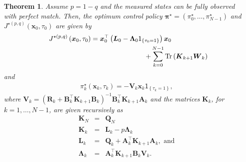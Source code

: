 \documentclass[10pt, journal, letterpaper]{IEEEtran}
\newcommand{\paren}[1]{\left(#1\right)}
\newcommand{\1}{\ensuremath{\mathbf{1}}} %
\newcommand{\I}[1]{\ensuremath{\mathsf{1}_{\left\{#1\right\}}}} %
\newcommand{\mincost}[2]{\ensuremath{J^{\star\paren{#1, #2}}}\paren{\vec{x}_0, \tau_0}}
\renewcommand{\vec}[1]{\ensuremath{\boldsymbol{#1}}} %
\newcommand{\tr}[1]{\ensuremath{{\rm Tr}\left(#1\right)}}
\newtheorem{theorem}{Theorem}
\begin{document}
\begin{theorem} \label{Thm: Min Cost Perfect State}
Assume $p = 1-q$ and the measured states can be {\em fully} observed with {\em perfect} match.  Then, the optimum control policy $\vec{\pi}^\star = \paren{\pi_0^\star, \ldots, \pi_{N-1}^\star}$ and $\mincost{p}{q}$ are given by
\begin{eqnarray}
\lefteqn{\mincost{p}{q} = \vec{x}_0^\top \paren{\vec{L}_0 - \vec{\Lambda}_0 \I{\tau_0 = 1}} \vec{x}_0} \hspace{8.0cm} \nonumber \\
\lefteqn{+\sum_{k=0}^{N-1} \tr{\vec{K}_{k+1} \vec{W}_k}} \label{Eqn: OptCost1}\hspace{3.0cm}
\end{eqnarray}
and
\begin{eqnarray}
\pi_k^\star\paren{\vec{x}_k, \tau_k} = -\vec{V}_k \vec{x}_k \I{\tau_k = 1}, \label{Eqn: Optimum Control1}
\end{eqnarray}
where $\vec{V}_k = \paren{\vec{R}_k + \vec{B}_k^\top \vec{K}_{k+1} \vec{B}_k}^{-1} \vec{B}_k^\top \vec{K}_{k+1} \vec{A}_k$ and the matrices $\vec{K}_k$, for $k=1, \ldots, N-1$, are given recursively as
\begin{eqnarray*}
\vec{K}_N &=& \vec{Q}_N \\
\vec{K}_k &=& \vec{L}_k - p \vec{\Lambda}_k \\
\vec{L}_k &=& \vec{Q}_k + \vec{A}_k^\top \vec{K}_{k+1} \vec{A}_k, \mbox{ and}\\
\vec{\Lambda}_k &=& \vec{A}_k^\top \vec{K}_{k+1} \vec{B}_k \vec{V}_k.
\end{eqnarray*}
\end{theorem}
\end{document}
